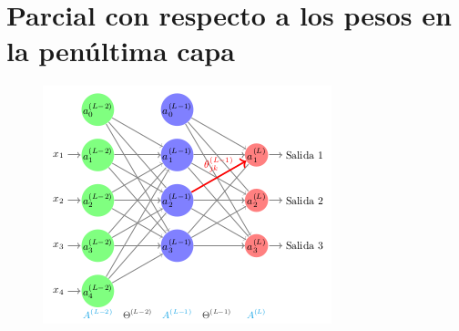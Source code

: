 \section{Parcial con respecto a los pesos en la penúltima capa}

\begin{figure}[h]
 \centering
 \includegraphics[scale=0.5]{../Figuras/AredNa.png}
 \label{fig:graficaLog}
\end{figure}

